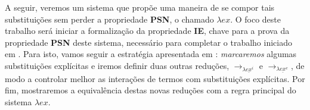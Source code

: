 A seguir, veremos um sistema que propõe uma maneira de se compor tais
substituições sem perder a propriedade \textbf{PSN}, o chamado $\lambda ex$. O
foco deste trabalho será iniciar a formalização da propriedade \textbf{IE},
chave para a prova da propriedade \textbf{PSN} deste sistema, necessário para
completar o trabalho iniciado em \cite{initial}.  Para isto, vamos
seguir a estratégia apresentada em \cite{delia}: \emph{marcaremos} algumas
substituições explícitas e iremos definir duas outras reduções, $\rightarrow_{\lambda
\underline{ex}^i}$ e $\rightarrow_{\lambda \underline{ex}^e}$, de modo a controlar melhor as
interações de termos com substituições explícitas. Por fim, mostraremos a
equivalência destas novas reduções com a regra principal do sistema $\lambda
ex$.




